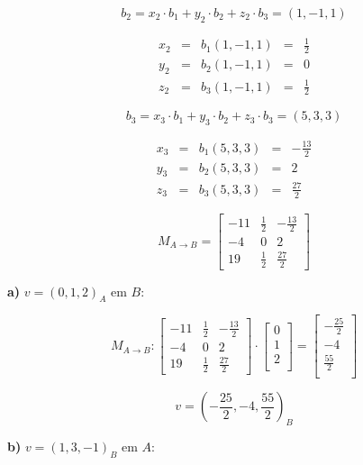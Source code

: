 \documentclass[11pt]{article}
\newenvironment{question}[1]
  {\par\addvspace{\medskipamount}
   \noindent\makebox[0pt][r]{\textbf{#1)} }\ignorespaces}
  {\par\addvspace{\medskipamount}}
\begin{document}
\begin{question}{1}
$$b_2 = x_2 \cdot b_1+y_2 \cdot b_2+z_2 \cdot b_3=(1,-1,1)$$

$$
\begin{array}{rcrcl}
    x_2 &= &b_1(1,-1,1) &= &\frac{1}{2}\\
    y_2 &= &b_2(1,-1,1) &= &0\\
    z_2 &= &b_3(1,-1,1) &= &\frac{1}{2}
\end{array}
$$

$$b_3 = x_3 \cdot b_1+y_3 \cdot b_2+z_3 \cdot b_3=(5,3,3)$$

$$
\begin{array}{rcrcl}
    x_3 &= &b_1(5,3,3) &= &-\frac{13}{2}\\
    y_3 &= &b_2(5,3,3) &= &2\\
    z_3 &= &b_3(5,3,3) &= &\frac{27}{2}
\end{array}
$$

$$
M_{A \rightarrow B}=\left[\begin{array}{rrr}
    -11 &\frac{1}{2} &-\frac{13}{2}\\
    -4 &0 &2\\
    19 &\frac{1}{2} &\frac{27}{2}
\end{array}\right]
$$

\newpage
\textbf{a)} $v=(0,1,2)_A$ em $B$:

$$
M_{A \rightarrow B}:
\left[\begin{array}{rrr}
    -11 &\frac{1}{2} &-\frac{13}{2}\\
    -4 &0 &2\\
    19 &\frac{1}{2} &\frac{27}{2}
\end{array}\right]
\cdot
\left[\begin{array}{r}
    0\\
    1\\
    2\\
\end{array}\right]
=
\left[\begin{array}{r}
    -\frac{25}{2}\\
    -4\\
    \frac{55}{2}\\
\end{array}\right]
$$

$$v=(-\frac{25}{2},-4,\frac{55}{2})_B$$

\textbf{b)} $v=(1,3,-1)_B$ em $A$:


\end{question}
\end{document}
